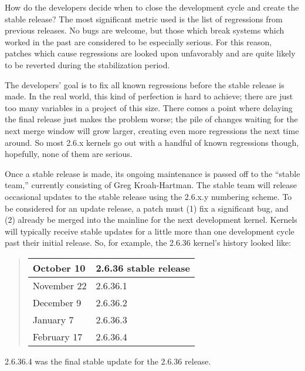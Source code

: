 \documentclass[a4paper,8pt,english]{sphinxmanual}
\begin{document}
How do the developers decide when to close the development cycle and create
the stable release?  The most significant metric used is the list of
regressions from previous releases.  No bugs are welcome, but those which
break systems which worked in the past are considered to be especially
serious.  For this reason, patches which cause regressions are looked upon
unfavorably and are quite likely to be reverted during the stabilization
period.

The developers' goal is to fix all known regressions before the stable
release is made.  In the real world, this kind of perfection is hard to
achieve; there are just too many variables in a project of this size.
There comes a point where delaying the final release just makes the problem
worse; the pile of changes waiting for the next merge window will grow
larger, creating even more regressions the next time around.  So most 2.6.x
kernels go out with a handful of known regressions though, hopefully, none
of them are serious.

Once a stable release is made, its ongoing maintenance is passed off to the
``stable team,'' currently consisting of Greg Kroah-Hartman.  The stable team
will release occasional updates to the stable release using the 2.6.x.y
numbering scheme.  To be considered for an update release, a patch must (1)
fix a significant bug, and (2) already be merged into the mainline for the
next development kernel.  Kernels will typically receive stable updates for
a little more than one development cycle past their initial release.  So,
for example, the 2.6.36 kernel's history looked like:
\begin{quote}

\begin{tabulary}{\linewidth}{|L|L|}
\hline

October 10
 & 
2.6.36 stable release
\\
\hline
November 22
 & 
2.6.36.1
\\
\hline
December 9
 & 
2.6.36.2
\\
\hline
January 7
 & 
2.6.36.3
\\
\hline
February 17
 & 
2.6.36.4
\\
\hline\end{tabulary}

\end{quote}

2.6.36.4 was the final stable update for the 2.6.36 release.
\end{document}
